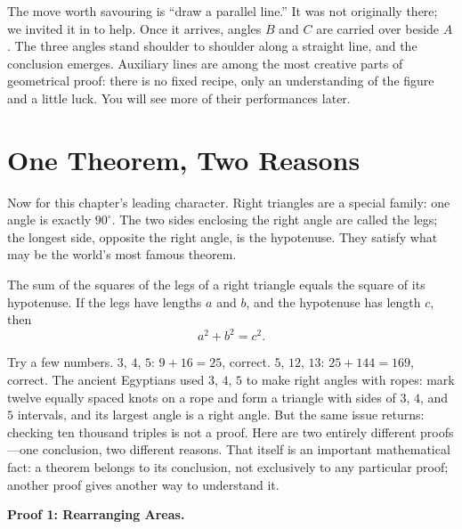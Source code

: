 The move worth savouring is ``draw a parallel line.'' It was not originally there; we invited it in to help. Once it arrives, angles $B$ and $C$ are carried over beside $A$. The three angles stand shoulder to shoulder along a straight line, and the conclusion emerges. Auxiliary lines are among the most creative parts of geometrical proof: there is no fixed recipe, only an understanding of the figure and a little luck. You will see more of their performances later.

\section{One Theorem, Two Reasons}

Now for this chapter's leading character. Right triangles are a special family: one angle is exactly $90^\circ$. The two sides enclosing the right angle are called the legs; the longest side, opposite the right angle, is the hypotenuse. They satisfy what may be the world's most famous theorem.

\begin{dingli}
The sum of the squares of the legs of a right triangle equals the square of its hypotenuse. If the legs have lengths $a$ and $b$, and the hypotenuse has length $c$, then
\[
a^2+b^2=c^2.
\]
\end{dingli}

Try a few numbers. $3$, $4$, $5$: $9+16=25$, correct. $5$, $12$, $13$: $25+144=169$, correct. The ancient Egyptians used $3$, $4$, $5$ to make right angles with ropes: mark twelve equally spaced knots on a rope and form a triangle with sides of $3$, $4$, and $5$ intervals, and its largest angle is a right angle. But the same issue returns: checking ten thousand triples is not a proof. Here are two entirely different proofs---one conclusion, two different reasons. That itself is an important mathematical fact: a theorem belongs to its conclusion, not exclusively to any particular proof; another proof gives another way to understand it.

\textbf{Proof 1: Rearranging Areas.}

\begin{center}
\end{center}

